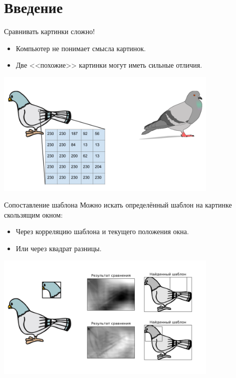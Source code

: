 \section{Введение}

\begin{frame}{Сравнивать картинки сложно!}

\begin{itemize}
    \item Компьютер не понимает смысла картинок.
    \item Две <<похожие>> картинки могут иметь сильные отличия.
\end{itemize}

\centering
\includegraphics[width=0.8\textwidth]{images/pigeon start.png}
\end{frame}

\begin{frame}{Сопоставление шаблона}
Можно искать определённый шаблон на картинке скользящим окном:
\begin{itemize}
    \item Через корреляцию шаблона и текущего положения окна.
    \item Или через квадрат разницы.
\end{itemize}

\centering
\includegraphics[width=0.8\textwidth]{images/pigeon template matching.png}

\end{frame}

